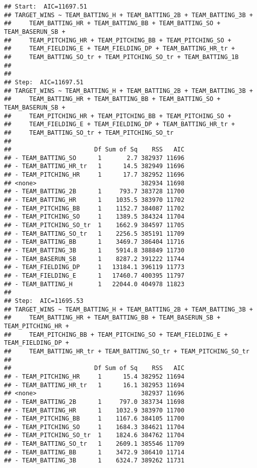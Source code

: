 \documentclass[]{article}
\begin{document}
\begin{verbatim}
## Start:  AIC=11697.51
## TARGET_WINS ~ TEAM_BATTING_H + TEAM_BATTING_2B + TEAM_BATTING_3B + 
##     TEAM_BATTING_HR + TEAM_BATTING_BB + TEAM_BATTING_SO + TEAM_BASERUN_SB + 
##     TEAM_PITCHING_HR + TEAM_PITCHING_BB + TEAM_PITCHING_SO + 
##     TEAM_FIELDING_E + TEAM_FIELDING_DP + TEAM_BATTING_HR_tr + 
##     TEAM_BATTING_SO_tr + TEAM_PITCHING_SO_tr + TEAM_BATTING_1B
## 
## 
## Step:  AIC=11697.51
## TARGET_WINS ~ TEAM_BATTING_H + TEAM_BATTING_2B + TEAM_BATTING_3B + 
##     TEAM_BATTING_HR + TEAM_BATTING_BB + TEAM_BATTING_SO + TEAM_BASERUN_SB + 
##     TEAM_PITCHING_HR + TEAM_PITCHING_BB + TEAM_PITCHING_SO + 
##     TEAM_FIELDING_E + TEAM_FIELDING_DP + TEAM_BATTING_HR_tr + 
##     TEAM_BATTING_SO_tr + TEAM_PITCHING_SO_tr
## 
##                       Df Sum of Sq    RSS   AIC
## - TEAM_BATTING_SO      1       2.7 382937 11696
## - TEAM_BATTING_HR_tr   1      14.5 382949 11696
## - TEAM_PITCHING_HR     1      17.7 382952 11696
## <none>                             382934 11698
## - TEAM_BATTING_2B      1     793.7 383728 11700
## - TEAM_BATTING_HR      1    1035.5 383970 11702
## - TEAM_PITCHING_BB     1    1152.7 384087 11702
## - TEAM_PITCHING_SO     1    1389.5 384324 11704
## - TEAM_PITCHING_SO_tr  1    1662.9 384597 11705
## - TEAM_BATTING_SO_tr   1    2256.5 385191 11709
## - TEAM_BATTING_BB      1    3469.7 386404 11716
## - TEAM_BATTING_3B      1    5914.8 388849 11730
## - TEAM_BASERUN_SB      1    8287.2 391222 11744
## - TEAM_FIELDING_DP     1   13184.1 396119 11773
## - TEAM_FIELDING_E      1   17460.7 400395 11797
## - TEAM_BATTING_H       1   22044.0 404978 11823
## 
## Step:  AIC=11695.53
## TARGET_WINS ~ TEAM_BATTING_H + TEAM_BATTING_2B + TEAM_BATTING_3B + 
##     TEAM_BATTING_HR + TEAM_BATTING_BB + TEAM_BASERUN_SB + TEAM_PITCHING_HR + 
##     TEAM_PITCHING_BB + TEAM_PITCHING_SO + TEAM_FIELDING_E + TEAM_FIELDING_DP + 
##     TEAM_BATTING_HR_tr + TEAM_BATTING_SO_tr + TEAM_PITCHING_SO_tr
## 
##                       Df Sum of Sq    RSS   AIC
## - TEAM_PITCHING_HR     1      15.4 382952 11694
## - TEAM_BATTING_HR_tr   1      16.1 382953 11694
## <none>                             382937 11696
## - TEAM_BATTING_2B      1     797.0 383734 11698
## - TEAM_BATTING_HR      1    1032.9 383970 11700
## - TEAM_PITCHING_BB     1    1167.6 384105 11700
## - TEAM_PITCHING_SO     1    1684.3 384621 11704
## - TEAM_PITCHING_SO_tr  1    1824.6 384762 11704
## - TEAM_BATTING_SO_tr   1    2609.1 385546 11709
## - TEAM_BATTING_BB      1    3472.9 386410 11714
## - TEAM_BATTING_3B      1    6324.7 389262 11731

\end{verbatim}
\end{document}
